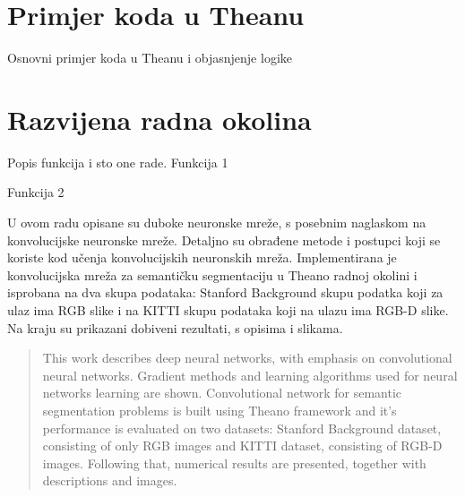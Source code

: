 \documentclass[times, utf8, diplomski, numeric]{fer}
\begin{document}
\section{Primjer koda u Theanu}

Osnovni primjer koda u Theanu i objasnjenje logike

\section{Razvijena radna okolina}

Popis funkcija i sto one rade.
Funkcija 1

Funkcija 2


\begin{sazetak}
U ovom radu opisane su duboke neuronske mreže, s posebnim naglaskom na konvolucijske neuronske mreže. Detaljno su obrađene metode i postupci koji se koriste kod učenja konvolucijskih neuronskih mreža. Implementirana je konvolucijska mreža za semantičku segmentaciju u Theano radnoj okolini i isprobana na dva skupa podataka: Stanford Background skupu podatka koji za ulaz ima RGB slike i na KITTI skupu podataka koji na ulazu ima RGB-D slike. Na kraju su prikazani dobiveni rezultati, s opisima i slikama.

\end{sazetak}

\begin{abstract}
This work describes deep neural networks, with emphasis on convolutional neural networks. Gradient methods and learning algorithms used for neural networks learning are shown. Convolutional network for semantic segmentation problems is built using Theano framework and it's performance is evaluated on two datasets: Stanford Background dataset, consisting of only RGB images and KITTI dataset, consisting of RGB-D images. Following that, numerical results are presented, together with descriptions and images.

\end{abstract}
\end{document}
